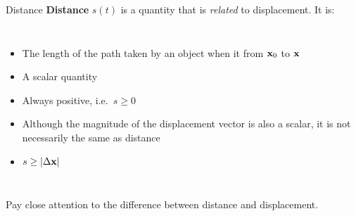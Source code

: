 \documentclass[12pt,compress,aspectratio=169]{beamer}
\newcommand{\mb}[1]{\ensuremath\mathbf{#1}}
\newcommand{\eq}[2]{\vspace{#1}{\Large\begin{displaymath}#2\end{displaymath}}}
\begin{document}
\begin{frame}{Distance}
  \textbf{Distance} $s(t)$ is a quantity that is \emph{related} to displacement.
  It is:
  \begin{columns}
    \begin{itemize}
    \item The length of the path taken by an object when it from $\mb{x}_0$ to
      $\mb{x}$
    \item A scalar quantity
    \item Always positive, i.e.\ $s\geq 0$
    \item Although the magnitude of the displacement vector is also a scalar,
      it is not necessarily the same as distance
    \item $s\geq |\Delta\mb{x}|$
    \end{itemize}
    
  \end{columns}
  \vspace{.15in}Pay close attention to the difference between distance and displacement.
\end{frame}




%
%
%
%  
%  
%
\end{document}
